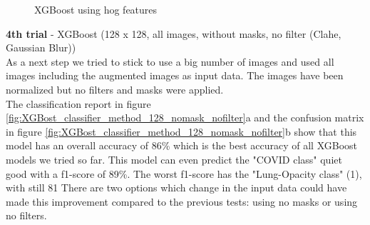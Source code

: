 \documentclass{article}
\begin{document}
\begin{figure}[!ht]
  \centering
  \qquad
  \caption{XGBoost using hog features}
  \label{fig:XGBost_hog}
\end{figure}

\textbf{4th trial} - XGBoost (128 x 128, all images, without masks, no filter (Clahe, Gaussian Blur))\\
As a next step we tried to stick to use a big number of images and used all images including the augmented images as input data. The images have been normalized but
no filters and masks were applied. \\
The classification report in figure \ref{fig:XGBost_classifier_method_128_nomask_nofilter}a and the confusion matrix in figure 
\ref{fig:XGBost_classifier_method_128_nomask_nofilter}b show that this model has an overall accuracy of 86\% which is the best accuracy of all XGBoost models we 
tried so far. This model can even predict the "COVID class" quiet good with a f1-score of 89\%. The worst f1-score has the "Lung-Opacity class" (1), with still 81%
There are two options which change in the input data could have made this improvement compared to the previous tests: using no masks or using no filters. 
\end{document}
